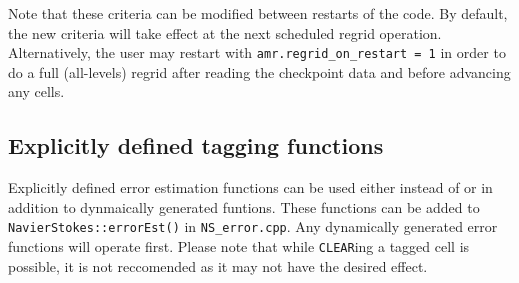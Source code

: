 Note that these criteria can be modified between restarts of the code.
By default, the new criteria will take effect at the next
scheduled regrid operation.  Alternatively, the user may restart with {\tt amr.regrid\_on\_restart = 1} in order to
do a full (all-levels) regrid after reading the checkpoint data and before advancing any cells.


\subsection{Explicitly defined tagging functions}
Explicitly defined error estimation functions can be used either instead of or in addition to
dynmaically generated funtions. These functions can be added to {\tt NavierStokes::errorEst()} in
{\tt NS\_error.cpp}. Any dynamically generated error functions will operate first.  
Please note that while {\tt CLEAR}ing a tagged cell is possible, it is not reccomended as it
may not have the desired effect.

